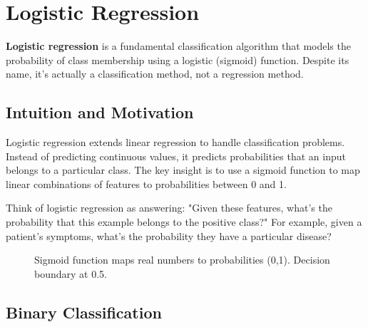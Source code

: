 
\section{Logistic Regression }
\label{sec:logistic-regression}

\textbf{Logistic regression} is a fundamental classification algorithm that models the probability of class membership using a logistic (sigmoid) function. Despite its name, it's actually a classification method, not a regression method.

\subsection{Intuition and Motivation}

Logistic regression extends linear regression to handle classification problems. Instead of predicting continuous values, it predicts probabilities that an input belongs to a particular class. The key insight is to use a sigmoid function to map linear combinations of features to probabilities between 0 and 1.

Think of logistic regression as answering: "Given these features, what's the probability that this example belongs to the positive class?" For example, given a patient's symptoms, what's the probability they have a particular disease?

\begin{figure}[htbp]
\centering
{}
\caption{Sigmoid function maps real numbers to probabilities (0,1). Decision boundary at 0.5.}
\label{fig:sigmoid-function}
\end{figure}

\subsection{Binary Classification}

